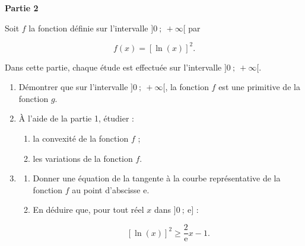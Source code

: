 \documentclass[10pt]{article}
\begin{document}
\bigskip

\textbf{Partie 2}

\medskip

Soit $f$ la fonction définie sur l'intervalle $]0~;~+ \infty[$ par

\[f(x) = [\ln (x)]^2.\]

 Dans cette partie, chaque étude est effectuée sur l'intervalle $]0~;~+ \infty[$.

\medskip

\begin{enumerate}
\item Démontrer que sur l'intervalle $]0~;~+ \infty[$, la fonction $f$ est une primitive de la fonction $g$.
\item À l'aide de la partie 1, étudier :
	\begin{enumerate}
		\item la convexité de la fonction $f$ ;
		\item les variations de la fonction $f$.
\end{enumerate}
\item 
	\begin{enumerate}
		\item Donner une équation de la tangente à la courbe représentative de la fonction $f$ au point d'abscisse e.
		\item En déduire que, pour tout réel $x$ dans $]0~;~\text{e}]$ :
		
\[[\ln (x)]^2 \geqslant \dfrac{2}{\text{e}}x - 1.\]

	\end{enumerate}
\end{enumerate}
\bigskip
\end{document}

